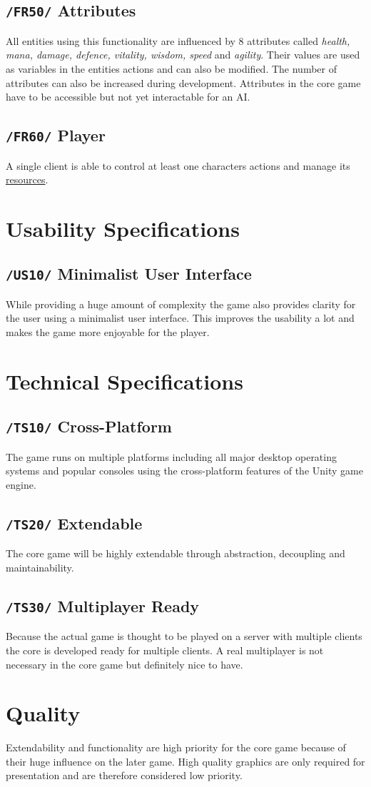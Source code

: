 \documentclass[11pt]{article}
\begin{document}
\subsection{\texttt{/FR50/} Attributes}\label{subsec:fs50attributes}
All entities using this functionality are influenced by 8 attributes called \textit{health, mana, damage, defence, vitality, wisdom, speed} and \textit{agility}. 
Their values are used as variables in the entities actions and can also be modified. The number of attributes can also be increased during development.
Attributes in the core game have to be accessible but not yet interactable for an AI.
\subsection{\texttt{/FR60/} Player}\label{subsec:fs60player}
A single client is able to control at least one characters actions and manage its \hyperref[subsec:fs40resources]{resources}.

\section{Usability Specifications}\label{sec:us}
\subsection{\texttt{/US10/} Minimalist User Interface}
While providing a huge amount of complexity the game also provides clarity for the user using a minimalist user interface. This improves the usability a lot and makes the game more enjoyable for the player.

\section{Technical Specifications}\label{sec:ts}
\subsection{\texttt{/TS10/} Cross-Platform}
The game runs on multiple platforms including all major desktop operating systems and popular consoles using the cross-platform features of the Unity game engine.
\subsection{\texttt{/TS20/} Extendable}
The core game will be highly extendable through abstraction, decoupling and maintainability.
\subsection{\texttt{/TS30/} Multiplayer Ready}
Because the actual game is thought to be played on a server with multiple clients the core is developed ready for multiple clients.
A real multiplayer is not necessary in the core game but definitely nice to have.

\section{Quality}
Extendability and functionality are high priority for the core game because of their huge influence on the later game.
High quality graphics are only required for presentation and are therefore considered low priority.
\end{document}
